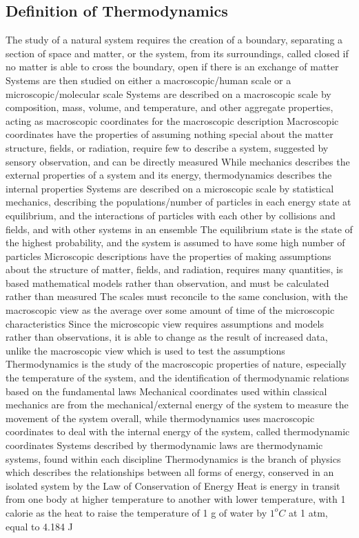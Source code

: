 \documentclass[11 pt, twoside]{article}
\newenvironment{outline*}
{
	\begin{outline}[enumerate]
	}
	{\end{outline}
}
\begin{document}
\subsection{Definition of Thermodynamics}
\begin{outline*}
\1 The study of a natural system requires the creation of a boundary, separating a section of space and matter, or the system, from its surroundings, called closed if no matter is able to cross the boundary, open if there is an exchange of matter
\1 Systems are then studied on either a macroscopic/human scale or a microscopic/molecular scale
\2 Systems are described on a macroscopic scale by composition, mass, volume, and temperature, and other aggregate properties, acting as macroscopic coordinates for the macroscopic description
\3 Macroscopic coordinates have the properties of assuming nothing special about the matter structure, fields, or radiation, require few to describe a system, suggested by sensory observation, and can be directly measured
\3 While mechanics describes the external properties of a system and its energy, thermodynamics describes the internal properties
\2 Systems are described on a microscopic scale by statistical mechanics, describing the populations/number of particles in each energy state at equilibrium, and the interactions of particles with each other by collisions and fields, and with other systems in an ensemble
\3 The equilibrium state is the state of the highest probability, and the system is assumed to have some high number of particles
\3 Microscopic descriptions have the properties of making assumptions about the structure of matter, fields, and radiation, requires many quantities, is based mathematical models rather than observation, and must be calculated rather than measured
\2 The scales must reconcile to the same conclusion, with the macroscopic view as the average over some amount of time of the microscopic characteristics
\3 Since the microscopic view requires assumptions and models rather than observations, it is able to change as the result of increased data, unlike the macroscopic view which is used to test the assumptions
\1 Thermodynamics is the study of the macroscopic properties of nature, especially the temperature of the system, and the identification of thermodynamic relations based on the fundamental laws
\2 Mechanical coordinates used within classical mechanics are from the mechanical/external energy of the system to measure the movement of the system overall, while thermodynamics uses macroscopic coordinates to deal with the internal energy of the system, called thermodynamic coordinates
\2 Systems described by thermodynamic laws are thermodynamic systems, found within each discipline
\1 Thermodynamics is the branch of physics which describes the relationships between all forms of energy, conserved in an isolated system by the Law of Conservation of Energy
\2 Heat is energy in transit from one body at higher temperature to another with lower temperature, with 1 calorie as the heat to raise the temperature of 1 g of water by $1^oC$ at 1 atm, equal to 4.184 J
\end{outline*}
\end{document}
